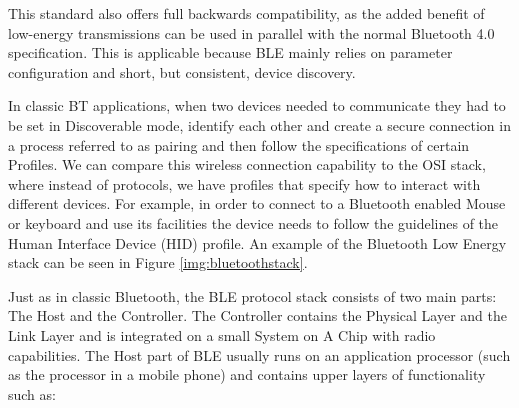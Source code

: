 This standard also offers full backwards compatibility, as the added benefit of low-energy transmissions can be used in parallel with the normal Bluetooth 4.0 specification. This is applicable because BLE mainly relies on parameter configuration and short, but consistent, device discovery.

In classic BT applications, when two devices needed to communicate they had to be set in Discoverable mode, identify each other and create a secure connection in a process referred to as pairing and then follow the specifications of certain Profiles. We can compare this wireless connection capability to the OSI stack, where instead of protocols, we have profiles that specify how to interact with different devices. For example, in order to connect to a Bluetooth enabled
Mouse or keyboard and use its facilities the device needs to follow the guidelines of the Human Interface Device (HID) profile. An example of the Bluetooth Low Energy stack can be seen in Figure \ref{img:bluetoothstack}.


Just as in classic Bluetooth\cite{haartsen2000bluetooth}, the BLE protocol stack consists of two main parts: The Host and the Controller. The Controller contains the Physical Layer and the Link Layer and is integrated on a small System on A Chip with radio capabilities. The Host part of BLE usually runs on an application processor (such as the processor in a mobile phone) and contains upper layers of functionality such as:

